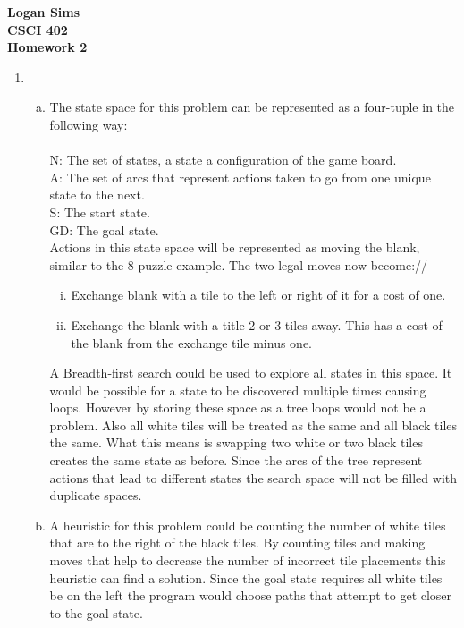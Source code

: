 \documentclass[11pt]{article}
\begin{document}
\begin{center}
\textbf{Logan Sims \\ CSCI 402 \\ Homework 2  }
\end{center}

\begin{enumerate}[1.]
\item
  \begin{enumerate}[a.]
  \item
  The state space for this problem can be represented as a four-tuple in the following way:\\\\
  N: The set of states, a state a configuration of the game board.\\
  A: The set of arcs that represent actions taken to go from one unique state to the next.\\
  S: The start state.\\
  GD: The goal state.\\
  
  Actions in this state space will be represented as moving the blank, similar to the 8-puzzle example. The two legal moves now become://
  \begin{enumerate}[i.]
  \item Exchange blank with a tile to the left or right of it for a cost of one.
  \item Exchange the blank with a title 2 or 3 tiles away. This has a cost of the blank from the exchange tile minus one. 
  \end{enumerate}
  
  A Breadth-first search could be used to explore all states in this space. It would be possible for a state to be discovered multiple times causing loops. However by storing these space as a tree loops would not be a problem. Also all white tiles will be treated as the same and all black tiles the same. What this means is swapping two white or two black tiles creates the same state as before. Since the arcs of the tree represent actions that lead to different states the search space will not be filled with duplicate spaces. 
  
  \item
  A heuristic for this problem could be counting the number of white tiles that are to the right of the black tiles. By counting tiles and making moves that help to decrease the number of incorrect tile placements this heuristic can find a solution. Since the goal state requires all white tiles be on the left the program would choose paths that attempt to get closer to the goal state.\\
  

\end{enumerate}
\end{enumerate}
\end{document}
